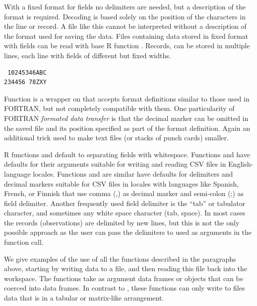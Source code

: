 \documentclass[krantz2]{krantz}\usepackage{knitr}%
\begin{document}
With a fixed format for fields no delimiters are needed, but a description of the format is required. Decoding is based solely on the position of the characters in the line or record. A file like this cannot be interpreted without a description of the format used for saving the data. Files containing data stored in fixed format with fields can be read with base R function . Records, can be stored in multiple lines, each line with fields of different but fixed widths.
\begin{verbatim}
 10245346ABC
234456 78ZXY
\end{verbatim}

Function  is a wrapper on  that accepts format definitions similar to those used in FORTRAN, but not completely compatible with them. One particularity of FORTRAN \emph{formated data transfer} is that the decimal marker can be omitted in the saved file and its position specified as part of the format definition. Again an additional trick used to make text files (or stacks of punch cards) smaller.

R functions  and  default to separating fields with whitespace. Functions  and  have defaults for their arguments suitable for writing and reading CSV files in English-language locales. Functions  and  are similar have defaults for delimiters and decimal markers suitable for CSV files in locales with languages like Spanish, French, or Finnish that use comma (,) as decimal marker and semi-colon (;) as field delimiter. Another frequently used field delimiter is the ``tab'' or tabulator character, and sometimes any white space character (tab, space). In most cases the records (observations) are delimited by new lines, but this is not the only possible approach as the user can pass the delimiters to used as arguments in the function call.

We give examples of the use of all the functions described in the paragraphs above, starting by writing data to a file, and then reading this file back into the workspace. The  functions take as argument data frames or objects that can be coerced into data frames. In contrast to , these functions can only write to files data that is in a tabular or matrix-like arrangement.

\begin{knitrout}\footnotesize
{}\color{fgcolor}\begin{kframe}
\begin{alltt}
 \hlkwb{<-} \hlstd{(} \hlstd{=} \hlopt{:}\hlstd{,}  \hlstd{=} \hlopt{:} \hlopt{/} \hlstd{)}
\end{alltt}
\end{kframe}
\end{knitrout}
\end{document}
